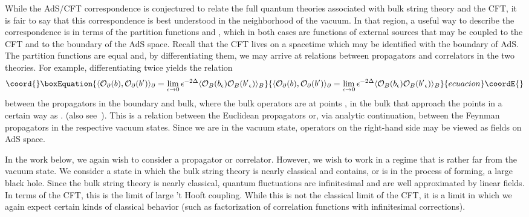 \documentclass[a4paper,12pt]{article}
\def\calo{{\cal O}}
\begin{document}
While the AdS/CFT correspondence is conjectured to relate the full
quantum theories associated with bulk string theory and the CFT, it is
fair to say that this correspondence is best understood in the
neighborhood of the vacuum.  In that region, a useful way to describe
the correspondence is in terms of the partition functions \coordHE{}
and \coordHE{}, which in both cases are functions of external sources
that may be coupled to the CFT and to the boundary of the AdS space.
Recall that the CFT lives on a spacetime which may be identified with
the boundary of AdS\coordHE{}.  The partition functions are equal and, by
differentiating them, we may arrive at relations between propagators
and correlators in the two theories.  For example, differentiating
twice yields the relation~\cite{bdhm}
\begin{equation}\coord{}\boxEquation{ \label{prop1}
\langle \calo_\partial (b), \calo_\partial (b') \rangle_{\partial} =
\lim_{\epsilon \rightarrow 0} \epsilon^{-2 \Delta} \langle \calo_{B}
(b_\epsilon) \calo_B (b'{}_\epsilon) \rangle_B
}{ \langle \calo_\partial (b), \calo_\partial (b') \rangle_{\partial} =
\lim_{\epsilon \rightarrow 0} \epsilon^{-2 \Delta} \langle \calo_{B}
(b_\epsilon) \calo_B (b'{}_\epsilon) \rangle_B
}{ecuacion}\coordE{}\end{equation}
between the propagators in the boundary and bulk, where the bulk
operators \myHighlight{$\calo_B$}\coordHE{} are at points \coordHE{}, \coordHE{} in the
bulk that approach the points \coordHE{} in a certain way as \coordHE{}.  (also see~\cite{witten,gkp}).  This is a relation
between the Euclidean propagators or, via analytic continuation,
between the Feynman propagators in the respective vacuum states.
Since we are in the vacuum state, operators on the right-hand
side may be viewed as fields on AdS space.


In the work below, we again wish to consider a propagator or
correlator.  However, we wish to work in a regime that is rather far
from the vacuum state.  We consider a state in which the bulk string
theory is nearly classical and contains, or is in the process of
forming, a large black hole.  Since the bulk string theory is nearly
classical, quantum fluctuations are infinitesimal and are well
approximated by linear fields.  In terms of the CFT, this is the limit
of large 't Hooft coupling.  While this is not the classical limit of
the CFT, it is a limit in which we again expect certain kinds of
classical behavior (such as factorization of correlation functions
with infinitesimal corrections).
\end{document}
